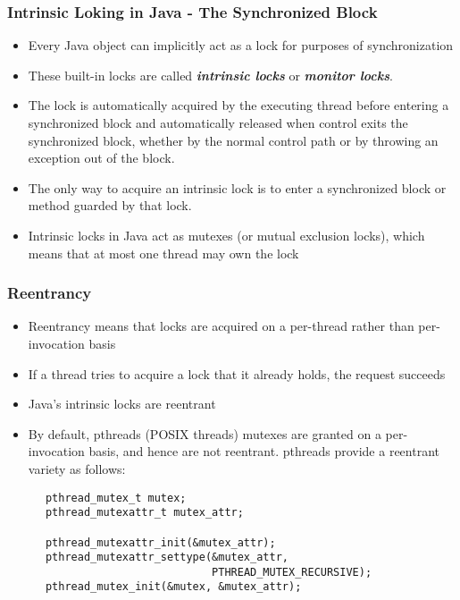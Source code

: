 \documentclass{beamer}
\begin{document}
  \begin{frame}
    \frametitle{Intrinsic Loking in Java - The Synchronized Block}
    \begin{itemize}
      \addtolength{\itemsep}{5pt}
      \item Every Java object can implicitly act as a lock for purposes of synchronization
      \item These built-in locks are called \textit{\textbf{intrinsic locks}} or
            \textbf{\emph{monitor locks}}.
      \item The lock is automatically acquired by the executing thread before entering a
            synchronized block and automatically released when control exits the synchronized block,
            whether by the normal control path or by throwing an exception out of the block.
      \item The only way to acquire an intrinsic lock is to enter a synchronized block or method
            guarded by that lock.
      \item Intrinsic locks in Java act as mutexes (or mutual exclusion locks), which means that
            at most one thread may own the lock
    \end{itemize}
  \end{frame}
    
  \begin{frame}[fragile]
    \frametitle{Reentrancy}
    \begin{itemize}
      \item Reentrancy means that locks are acquired on a per-thread rather than per-invocation basis
      \item If a thread tries to acquire a lock that it already holds, the request succeeds
      \item Java's intrinsic locks are reentrant
      \item By default, pthreads (POSIX threads) mutexes are granted on a per-invocation basis, and
            hence are not reentrant. pthreads provide a reentrant variety as follows:
    \end{itemize}
    \begin{verbatim}
      pthread_mutex_t mutex;
      pthread_mutexattr_t mutex_attr;

      pthread_mutexattr_init(&mutex_attr);
      pthread_mutexattr_settype(&mutex_attr,
                                PTHREAD_MUTEX_RECURSIVE);
      pthread_mutex_init(&mutex, &mutex_attr);
    \end{verbatim}
  \end{frame}
\end{document}
